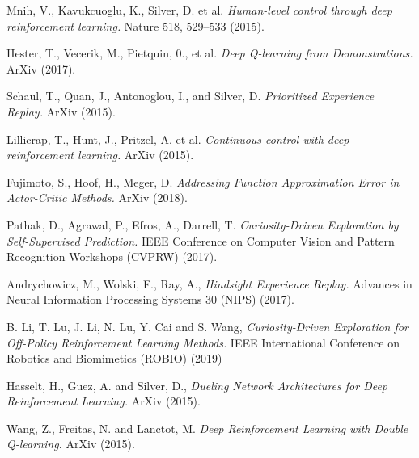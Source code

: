 \documentclass[12pt,a4paper]{article}
\begin{document}
\begin{thebibliography}{99}


  Mnih, V., Kavukcuoglu, K., Silver, D. et al. 
  {\em Human-level control through deep reinforcement learning.} 
   Nature 518, 529–533 (2015).

  Hester, T., Vecerik, M., Pietquin, 0., et al. 
  {\em Deep Q-learning from Demonstrations.}
  ArXiv (2017).

  Schaul, T., Quan, J., Antonoglou, I., and Silver, D.
  {\em Prioritized Experience Replay.}
  ArXiv (2015).

  Lillicrap, T., Hunt, J., Pritzel, A. et al.
  {\em Continuous control with deep reinforcement learning.}
  ArXiv (2015).

  Fujimoto, S., Hoof, H., Meger, D.
  {\em Addressing Function Approximation Error in Actor-Critic Methods.}
  ArXiv (2018).

   Pathak, D., Agrawal, P., Efros, A., Darrell, T.
  {\em Curiosity-Driven Exploration by Self-Supervised Prediction.}
  IEEE Conference on Computer Vision and Pattern Recognition Workshops (CVPRW) (2017).

   Andrychowicz, M., Wolski, F., Ray, A.,
  {\em Hindsight Experience Replay.}
  Advances in Neural Information Processing Systems 30 (NIPS) (2017).

   B. Li, T. Lu, J. Li, N. Lu, Y. Cai and S. Wang, 
  {\em Curiosity-Driven Exploration for Off-Policy Reinforcement Learning Methods.}
  IEEE International Conference on Robotics and Biomimetics (ROBIO) (2019)

   Hasselt, H., Guez, A. and Silver, D., 
  {\em Dueling Network Architectures for Deep Reinforcement Learning.}
  ArXiv (2015).

   Wang, Z., Freitas, N. and Lanctot, M. 
  {\em Deep Reinforcement Learning with Double Q-learning.}
  ArXiv (2015).

\end{thebibliography}
	
\end{document}
